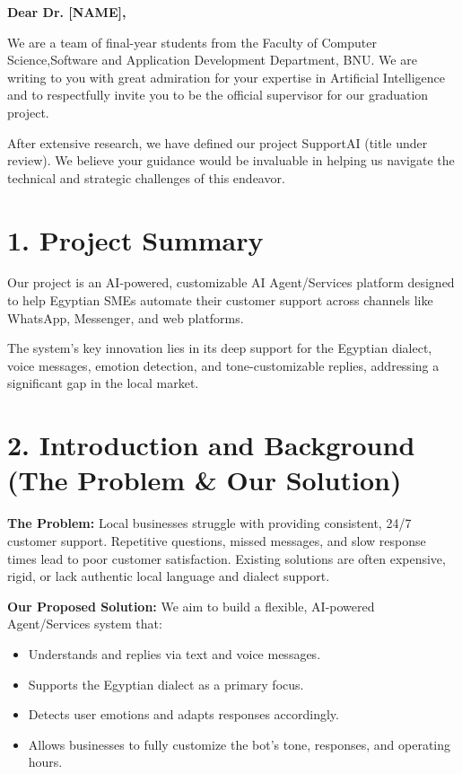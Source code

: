 \documentclass[12pt,a4paper]{article}
\begin{document}
\begin{flushleft}
\textbf{Dear Dr. [NAME],} \\
\end{flushleft}

We are a team of final-year students from the Faculty of Computer Science,Software and Application Development Department, BNU. 
We are writing to you with great admiration for your expertise in Artificial Intelligence 
and to respectfully invite you to be the official supervisor for our graduation project. 

After extensive research, we have defined our project  SupportAI (title under review). 
We believe your guidance would be invaluable in helping us navigate the technical 
and strategic challenges of this endeavor. 

\section*{1. Project Summary }
Our project is an AI-powered, customizable AI Agent/Services platform designed to help 
Egyptian SMEs automate their customer support across channels like WhatsApp, Messenger, 
and web platforms. 

The system's key innovation lies in its deep support for the Egyptian dialect, 
voice messages, emotion detection, and tone-customizable replies, addressing a significant 
gap in the local market. 

\section*{2. Introduction and Background (The Problem \& Our Solution)}

\textbf{The Problem:}  
Local businesses struggle with providing consistent, 24/7 customer support. 
Repetitive questions, missed messages, and slow response times lead to poor 
customer satisfaction. Existing solutions are often expensive, rigid, or 
lack authentic local language and dialect support.  

\textbf{Our Proposed Solution:}  
We aim to build a flexible, AI-powered Agent/Services system that:
\begin{itemize}[leftmargin=*]
    \item Understands and replies via text and voice messages.
    \item Supports the Egyptian dialect as a primary focus.
    \item Detects user emotions and adapts responses accordingly.
    \item Allows businesses to fully customize the bot's tone, responses, and operating hours.
\end{itemize}
\end{document}

